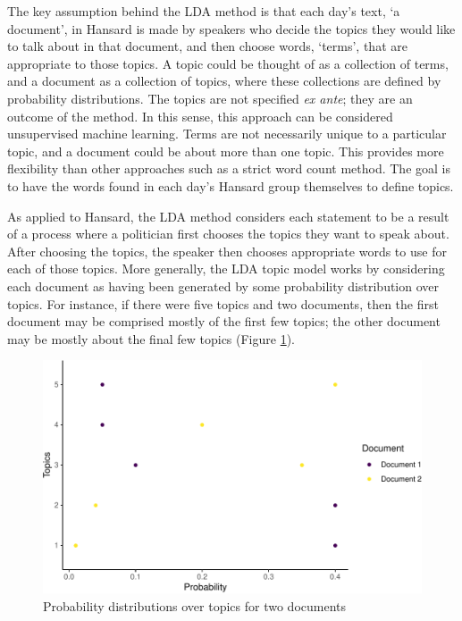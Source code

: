 \documentclass[12pt,]{article}
\theoremstyle{definition}
\theoremstyle{definition}
\theoremstyle{definition}
\theoremstyle{remark}
\begin{document}
The key assumption behind the LDA method is that each day's text, `a
document', in Hansard is made by speakers who decide the topics they
would like to talk about in that document, and then choose words,
`terms', that are appropriate to those topics. A topic could be thought
of as a collection of terms, and a document as a collection of topics,
where these collections are defined by probability distributions. The
topics are not specified \emph{ex ante}; they are an outcome of the
method. In this sense, this approach can be considered unsupervised
machine learning. Terms are not necessarily unique to a particular
topic, and a document could be about more than one topic. This provides
more flexibility than other approaches such as a strict word count
method. The goal is to have the words found in each day's Hansard group
themselves to define topics.

As applied to Hansard, the LDA method considers each statement to be a
result of a process where a politician first chooses the topics they
want to speak about. After choosing the topics, the speaker then chooses
appropriate words to use for each of those topics. More generally, the
LDA topic model works by considering each document as having been
generated by some probability distribution over topics. For instance, if
there were five topics and two documents, then the first document may be
comprised mostly of the first few topics; the other document may be
mostly about the final few topics (Figure
\ref{fig:topicsoverdocuments}).

\begin{figure}
\centering
\includegraphics{svm-rmarkdown-article-example_files/figure-latex/topicsoverdocuments-1.pdf}
\caption{\label{fig:topicsoverdocuments}Probability distributions over
topics for two documents}
\end{figure}
\end{document}

